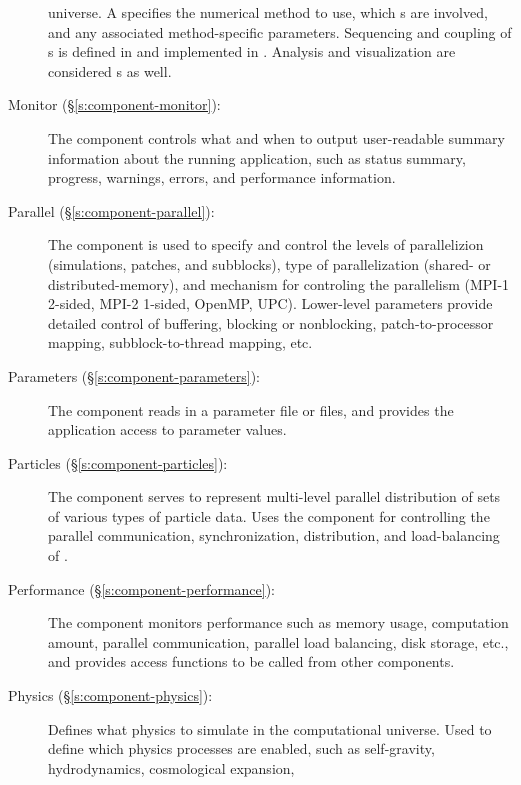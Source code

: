 \begin{description}
        universe.  A  specifies the numerical method to
        use, which s are involved, and any associated
        method-specific parameters.  Sequencing and coupling of
        s is defined in  and implemented in
        .  Analysis and visualization are considered
        s as well.
%
 \item [\todo Monitor (\S\ref{s:component-monitor}): ]
%
        The  component controls what and when to output
        user-readable summary information about the running
        application, such as status summary, progress, warnings,
        errors, and performance information.
%
 \item [\todo Parallel (\S\ref{s:component-parallel}): ]
%
        The  component is used to specify and control
        the levels of parallelizion (simulations, patches, and
        subblocks), type of parallelization (shared- or
        distributed-memory), and mechanism for controling the
        parallelism (MPI-1 2-sided, MPI-2 1-sided, OpenMP, UPC).
        Lower-level parameters provide detailed control of buffering,
        blocking or nonblocking, patch-to-processor mapping,
        subblock-to-thread mapping, etc.
%
 \item [\todo Parameters (\S\ref{s:component-parameters}): ]
%
        The  component
        reads in a parameter file or files, and provides the
        application access to parameter values.
%
 \item [\todo Particles (\S\ref{s:component-particles}): ]
%
        The  component serves to represent multi-level
        parallel distribution of sets of various types of particle
        data.  Uses the  component for controlling the
        parallel communication, synchronization, distribution, and
        load-balancing of .
%
 \item [\todo Performance (\S\ref{s:component-performance}): ]
%
        The  component monitors performance such as
        memory usage, computation amount, parallel communication,
        parallel load balancing, disk storage, etc., and provides
        access functions to be called from other components.
%
 \item [\todo Physics (\S\ref{s:component-physics}): ]
%
        Defines what physics to simulate in the computational
        universe.  Used to define which physics processes are enabled,
        such as self-gravity, hydrodynamics, cosmological expansion,

\end{description}
